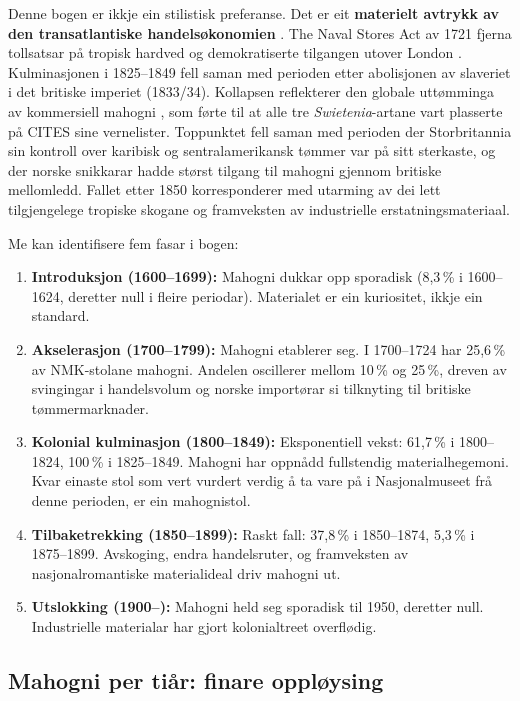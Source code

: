 \documentclass[10pt, a4paper, twocolumn]{article}
\begin{document}
Denne bogen er ikkje ein stilistisk preferanse. Det er eit \textbf{materielt avtrykk av den transatlantiske handelsøkonomien} \citep[jf.][]{anderson2012, bowett2012}. The Naval Stores Act av 1721 fjerna tollsatsar på tropisk hardved og demokratiserte tilgangen utover London \citep{bowett2012}. Kulminasjonen i 1825--1849 fell saman med perioden etter abolisjonen av slaveriet i det britiske imperiet (1833/34). Kollapsen reflekterer den globale uttømminga av kommersiell mahogni \citep{anderson2012}, som førte til at alle tre \emph{Swietenia}-artane vart plasserte på CITES sine vernelister. Toppunktet fell saman med perioden der Storbritannia sin kontroll over karibisk og sentralamerikansk tømmer var på sitt sterkaste, og der norske snikkarar hadde størst tilgang til mahogni gjennom britiske mellomledd. Fallet etter 1850 korresponderer med utarming av dei lett tilgjengelege tropiske skogane og framveksten av industrielle erstatningsmateriaal.

Me kan identifisere fem fasar i bogen:

\begin{enumerate}
  \item \textbf{Introduksjon (1600--1699):} Mahogni dukkar opp sporadisk (8,3\,\% i 1600--1624, deretter null i fleire periodar). Materialet er ein kuriositet, ikkje ein standard.
  \item \textbf{Akselerasjon (1700--1799):} Mahogni etablerer seg. I 1700--1724 har 25,6\,\% av NMK-stolane mahogni. Andelen oscillerer mellom 10\,\% og 25\,\%, dreven av svingingar i handelsvolum og norske importørar si tilknyting til britiske tømmermarknader.
  \item \textbf{Kolonial kulminasjon (1800--1849):} Eksponentiell vekst: 61,7\,\% i 1800--1824, 100\,\% i 1825--1849. Mahogni har oppnådd fullstendig materialhegemoni. Kvar einaste stol som vert vurdert verdig å ta vare på i Nasjonalmuseet frå denne perioden, er ein mahognistol.
  \item \textbf{Tilbaketrekking (1850--1899):} Raskt fall: 37,8\,\% i 1850--1874, 5,3\,\% i 1875--1899. Avskoging, endra handelsruter, og framveksten av nasjonalromantiske materialideal driv mahogni ut.
  \item \textbf{Utslokking (1900--):} Mahogni held seg sporadisk til 1950, deretter null. Industrielle materialar har gjort kolonialtreet overflødig.
\end{enumerate}

\subsection{Mahogni per tiår: finare oppløysing}
\end{document}

